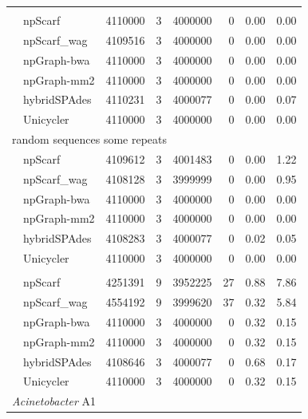\begin{longtable}[!hpt]{llcrrrrr}
\rowcolor{Gray}
\multicolumn{8}{l}{random sequences no repeats} \\* %
\nobreakmidrule
\rowcolor{Gray}
& npScarf &  4110000 &  3  &  4000000  &  0  & 0.00  & 0.00\\*
\rowcolor{Gray}
& npScarf\_wag & 4109516  &  3  &  4000000  &  0  & 0.00  & 0.00\\*
\rowcolor{Gray}
& npGraph-bwa & 4110000  &  3  &  4000000  &  0  & 0.00  & 0.00\\*
\rowcolor{Gray}
& npGraph-mm2 & 4110000  &  3  &  4000000  &  0  & 0.00  & 0.00\\*
\rowcolor{Gray}
& hybridSPAdes & 4110231  &  3  & 4000077   &  0  & 0.00  &  0.07\\*
\rowcolor{Gray}
& Unicycler & 4110000  &  3  &  4000000  &  0  & 0.00  &  0.00\\
\hline
\multicolumn{8}{l}{random sequences some repeats} \\* %
\nobreakmidrule
& npScarf & 4109612  &  3  &  4001483  &  0  &  0.00 &  1.22\\*
& npScarf\_wag & 4108128  &  3 &  3999999  &  0  &  0.00 &  0.95\\*
& npGraph-bwa & 4110000  &  3  &  4000000  &  0 &  0.00 &  0.00\\*
& npGraph-mm2 &  4110000 &  3  &   4000000 & 0  & 0.00  &  0.00\\*
& hybridSPAdes & 4108283  &  3  &  4000077  &  0  & 0.02  & 0.05\\*
& Unicycler &  4110000 &  3 & 4000000  &  0 & 0.00  &  0.00\\
\hline
\rowcolor{Gray}
\multicolumn{8}{l}{random sequences many repeats} \\* %
\nobreakmidrule
\rowcolor{Gray}
& npScarf &  4251391 &  9  &  3952225  &  27  & 0.88  & 7.86\\*
\rowcolor{Gray}
& npScarf\_wag &  4554192 &  9  &  3999620  &  37  & 0.32  & 5.84\\*
\rowcolor{Gray}
& npGraph-bwa & 4110000  &  3  &  4000000  &  0  &  0.32 & 0.15\\*
\rowcolor{Gray}
& npGraph-mm2 &  4110000 &  3  &  4000000  &  0  & 0.32  & 0.15\\*
\rowcolor{Gray}
& hybridSPAdes & 4108646  &  3  &  4000077  &  0  &  0.68 &  0.17\\*
\rowcolor{Gray}
& Unicycler & 4110000  &  3  &  4000000  &  0  &  0.32  & 0.15  \\
\hline
\multicolumn{8}{l}{\emph{Acinetobacter} A1} \\* %

\end{longtable}
